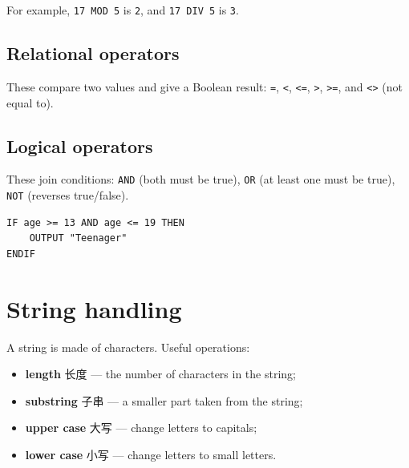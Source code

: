\documentclass[11pt]{article}
\begin{document}
\begin{center}
\end{center}

For example, \texttt{17 MOD 5} is \texttt{2}, and \texttt{17 DIV 5} is \texttt{3}.

\subsection*{Relational operators}

These compare two values and give a Boolean result: \texttt{=}, \texttt{\textless{}}, \texttt{\textless{}=}, \texttt{\textgreater{}}, \texttt{\textgreater{}=}, and \texttt{\textless{}\textgreater{}} (not equal to).

\subsection*{Logical operators}

These join conditions: \texttt{AND} (both must be true), \texttt{OR} (at least one must be true), \texttt{NOT} (reverses true/false).

\begin{Verbatim}
IF age >= 13 AND age <= 19 THEN
    OUTPUT "Teenager"
ENDIF
\end{Verbatim}

\section*{String handling}

A string is made of characters. Useful operations:

\begin{itemize}
\item \textbf{length} 长度 — the number of characters in the string;

\item \textbf{substring} 子串 — a smaller part taken from the string;

\item \textbf{upper case} 大写 — change letters to capitals;

\item \textbf{lower case} 小写 — change letters to small letters.

\end{itemize}
\end{document}
